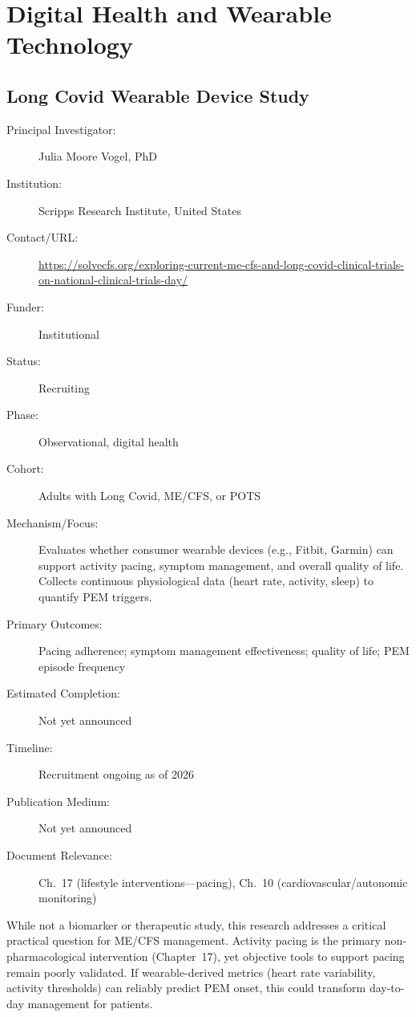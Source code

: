 \section{Digital Health and Wearable Technology}
\label{sec:registry-digital}

\subsection{Long Covid Wearable Device Study}
\label{sec:registry-wearable}

\begin{description}
    \item[Principal Investigator:] Julia Moore Vogel, PhD
    \item[Institution:] Scripps Research Institute, United States
    \item[Contact/URL:] \url{https://solvecfs.org/exploring-current-me-cfs-and-long-covid-clinical-trials-on-national-clinical-trials-day/}
    \item[Funder:] Institutional
    \item[Status:] Recruiting
    \item[Phase:] Observational, digital health
    \item[Cohort:] Adults with Long Covid, ME/CFS, or POTS
    \item[Mechanism/Focus:] Evaluates whether consumer wearable devices
        (e.g., Fitbit, Garmin) can support activity pacing, symptom
        management, and overall quality of life.  Collects continuous
        physiological data (heart rate, activity, sleep) to quantify
        PEM triggers.
    \item[Primary Outcomes:] Pacing adherence; symptom management
        effectiveness; quality of life; PEM episode frequency
    \item[Estimated Completion:] Not yet announced
    \item[Timeline:] Recruitment ongoing as of 2026
    \item[Publication Medium:] Not yet announced
    \item[Document Relevance:] Ch.~17 (lifestyle interventions---pacing),
        Ch.~10 (cardiovascular/autonomic monitoring)
\end{description}

While not a biomarker or therapeutic study, this research addresses a critical
practical question for ME/CFS management.  Activity pacing is the primary
non-pharmacological intervention (Chapter~17), yet objective tools to support
pacing remain poorly validated.  If wearable-derived metrics (heart rate
variability, activity thresholds) can reliably predict PEM onset, this could
transform day-to-day management for patients.

